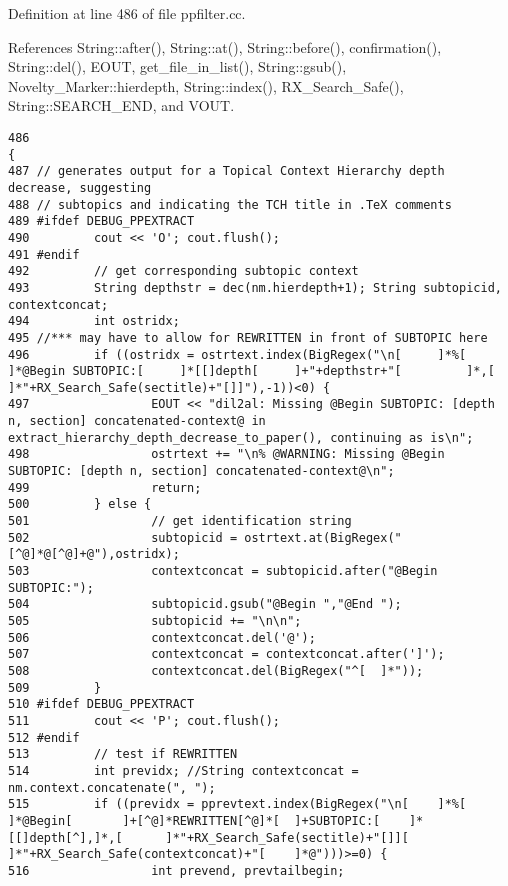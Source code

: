 Definition at line 486 of file ppfilter.cc.

References String::after(), String::at(), String::before(), confirmation(), String::del(), EOUT, get\_\-file\_\-in\_\-list(), String::gsub(), Novelty\_\-Marker::hierdepth, String::index(), RX\_\-Search\_\-Safe(), String::SEARCH\_\-END, and VOUT.



\footnotesize\begin{verbatim}486                                                                                                                                                                                        {
487 // generates output for a Topical Context Hierarchy depth decrease, suggesting
488 // subtopics and indicating the TCH title in .TeX comments
489 #ifdef DEBUG_PPEXTRACT
490         cout << 'O'; cout.flush();
491 #endif
492         // get corresponding subtopic context
493         String depthstr = dec(nm.hierdepth+1); String subtopicid, contextconcat;
494         int ostridx;
495 //*** may have to allow for REWRITTEN in front of SUBTOPIC here
496         if ((ostridx = ostrtext.index(BigRegex("\n[     ]*%[    ]*@Begin SUBTOPIC:[     ]*[[]depth[     ]+"+depthstr+"[         ]*,[    ]*"+RX_Search_Safe(sectitle)+"[]]"),-1))<0) {
497                 EOUT << "dil2al: Missing @Begin SUBTOPIC: [depth n, section] concatenated-context@ in extract_hierarchy_depth_decrease_to_paper(), continuing as is\n";
498                 ostrtext += "\n% @WARNING: Missing @Begin SUBTOPIC: [depth n, section] concatenated-context@\n";
499                 return;
500         } else {
501                 // get identification string
502                 subtopicid = ostrtext.at(BigRegex("[^@]*@[^@]+@"),ostridx);
503                 contextconcat = subtopicid.after("@Begin SUBTOPIC:");
504                 subtopicid.gsub("@Begin ","@End ");
505                 subtopicid += "\n\n";
506                 contextconcat.del('@');
507                 contextconcat = contextconcat.after(']');
508                 contextconcat.del(BigRegex("^[  ]*"));
509         }
510 #ifdef DEBUG_PPEXTRACT
511         cout << 'P'; cout.flush();
512 #endif
513         // test if REWRITTEN
514         int previdx; //String contextconcat = nm.context.concatenate(", ");
515         if ((previdx = pprevtext.index(BigRegex("\n[    ]*%[    ]*@Begin[       ]+[^@]*REWRITTEN[^@]*[  ]+SUBTOPIC:[    ]*[[]depth[^],]*,[      ]*"+RX_Search_Safe(sectitle)+"[]][      ]*"+RX_Search_Safe(contextconcat)+"[    ]*@")))>=0) {
516                 int prevend, prevtailbegin;

\end{verbatim}

